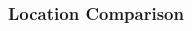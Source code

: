 \documentclass{beamer}
\begin{document}
\begin{frame}
\frametitle{Location Comparison}
\begin{columns}[T]
\begin{column}{.7\textwidth}
\begin{figure}
\setlength{\fboxsep}{0pt}%
\setlength{\fboxrule}{1pt}%
\end{figure}
\vspace{-25pt}
\begin{figure}
\setlength{\fboxsep}{0pt}%
\setlength{\fboxrule}{1pt}%
\end{figure}
\end{column}

\begin{column}{.3\textwidth}
\begin{figure}
\setlength{\fboxsep}{0pt}%
\setlength{\fboxrule}{1pt}%
\end{figure}
\end{column}
\end{columns}
\end{frame}

  
\end{document}
